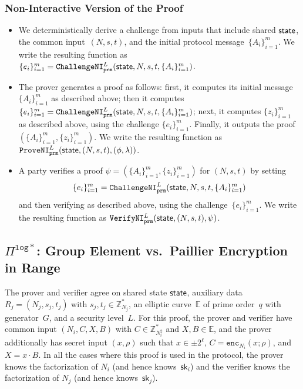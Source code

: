 \documentclass[11pt]{article}
\def\state{{\sf state}}
\newcommand{\enc}{\ensuremath{\mathtt{enc}}}
\newcommand{\proof}[1]{\ensuremath{\Pi^{\mathtt{#1}}}}
\newcommand{\challengeni}[1]{\ensuremath{\mathtt{ChallengeNI}_{\mathtt{#1}}}}
\newcommand{\proveni}[1]{\ensuremath{\mathtt{ProveNI}_{\mathtt{#1}}}}
\newcommand{\verifyni}[1]{\ensuremath{\mathtt{VerifyNI}_{\mathtt{#1}}}}
\newcommand{\sk}{\textsf{sk}}
\newcommand{\E}{\mathbb{E}}
\newcommand{\?}[1]{\stackrel{?}{#1}}
\begin{document}
\subsubsection{Non-Interactive Version of the Proof}
\begin{itemize}
  \item We deterministically derive a challenge from inputs that include shared $\state$, the common input~$(N,s,t)$, and the initial protocol message~$\{A_i\}_{i=1}^m$.   
  We write the resulting function as
  $\{e_i\}_{i=1}^m = \challengeni{prm}^L(\state, N, s, t, \{A_i\}_{i=1}^m)$.

  \item The prover generates a proof as follows: first, it computes its initial message $\{A_i\}_{i=1}^m$ as described above; then it computes $\{e_i\}_{i=1}^m = \challengeni{prm}^L(\state, N, s, t, \{A_i\}_{i=1}^m)$; next, it computes $\{z_i\}_{i=1}^m$ as described above, using the challenge $\{e_i\}_{i=1}^m$. Finally, it outputs the proof $(\{A_i\}_{i=1}^m, \{z_i\}_{i=1}^m)$. We write the resulting function as $\proveni{prm}^L(\state, (N, s, t), (\phi, \lambda))$.
  
  \item A party verifies a proof $\psi=(\{A_i\}_{i=1}^m, \{z_i\}_{i=1}^m)$ for $(N, s, t)$ by  setting \[\{e_i\}_{i=1}^m = \challengeni{prm}^L(\state, N, s, t, \{A_i\}_{i=1}^m)\] and then verifying as described above, using the challenge~$\{e_i\}_{i=1}^m$. We write the resulting function as $\verifyni{prm}^L(\state, (N, s, t), \psi)$.
  \end{itemize}

\subsection{$\proof{log*}$: Group Element vs.\ Paillier Encryption in Range}
The prover and verifier agree on shared state $\state$, auxiliary data $R_j=(N_j, s_j, t_j)$ with $s_j, t_j \in {\mathbb Z}^*_{N_j}$, 
an elliptic curve~$\E$ of prime order~$q$ with generator~$G$,
and a security level~$L$. For this proof, the prover and verifier have common input $(N_i, C, X, B)$ with $C \in {\mathbb Z}^*_{N_i^2}$ and $X, B \in \E$, and the prover additionally has secret input $(x, \rho)$ such that $x \in \pm 2^\ell$, $C=\enc_{N_i}(x; \rho)$, and $X = x \cdot B$.
In all the cases where this proof is used in the protocol, the prover knows the factorization of $N_i$ (and hence knows~$\sk_i$) and the verifier knows the factorization of $N_j$ (and hence knows~$\sk_j$).
\end{document}

